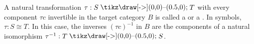 A natural transformation $\tau: S \mathbin{\raisebox{0.5pt}{\hspace{0.5pt}\tikz\draw[->](0,0)--(0.5,0);\hspace{0.5pt}}} T$ with every component $\tau c$ invertible in the target category $B$ is called a  or a . In symbols, $\tau: S \cong T$. In this case, the inverses $(\tau c)^{-1}$ in $B$ are the components of a natural isomorphism $\tau^{-1}: T \mathbin{\raisebox{0.5pt}{\hspace{0.5pt}\tikz\draw[->](0,0)--(0.5,0);\hspace{0.5pt}}} S$.
